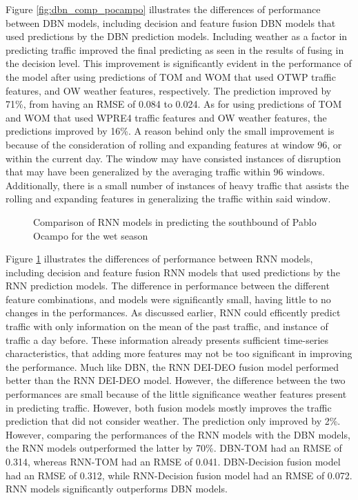 Figure \ref{fig:dbn_comp_pocampo} illustrates the differences of performance between DBN models, including decision and feature fusion DBN models that used predictions by the DBN prediction models. Including weather as a factor in predicting traffic improved the final predicting as seen in the results of fusing in the decision level. This improvement is significantly evident in the performance of the model after using predictions of TOM and WOM that used OTWP traffic features, and OW weather features, respectively. The prediction improved by 71\%, from having an RMSE of 0.084 to 0.024. As for using predictions of TOM and WOM that used WPRE4 traffic features and OW weather features, the predictions improved by 16\%. A reason behind only the small improvement is because of the consideration of rolling and expanding features at window 96, or within the current day. The window may have consisted instances of disruption that may have been generalized by the averaging traffic within 96 windows. Additionally, there is a small number of instances of heavy traffic that assists the rolling and expanding features in generalizing the traffic within said window. 


\begin{figure}[!t]
  \centering
  \captionsetup{justification=centering}
  \caption{Comparison of RNN models in predicting the southbound of Pablo Ocampo for the wet season}
  \label{fig:rnn_comp_pocampo}
\end{figure}

Figure \ref{fig:rnn_comp_pocampo} illustrates the differences of performance between RNN models, including decision and feature fusion RNN models that used predictions by the RNN prediction models. 
The difference in performance between the different feature combinations, and models were significantly small, having little to no changes in the performances. As discussed earlier, RNN could efficently predict traffic with only information on the mean of the past traffic, and instance of traffic a day before. These information already presents sufficient time-series characteristics, that adding more features may not be too significant in improving the performance. Much like DBN, the RNN DEI-DEO fusion model performed better than the RNN DEI-DEO model. However, the difference between the two performances are small because of the little significance weather features present in predicting traffic. However, both fusion models mostly improves the traffic prediction that did not consider weather. The prediction only improved by 2\%. However, comparing the performances of the RNN models with the DBN models, the RNN models outperformed the latter by 70\%. DBN-TOM had an RMSE of 0.314, whereas RNN-TOM had an RMSE of 0.041. DBN-Decision fusion model had an RMSE of 0.312, while RNN-Decision fusion model had an RMSE of 0.072. RNN models significantly outperforms DBN models. 

